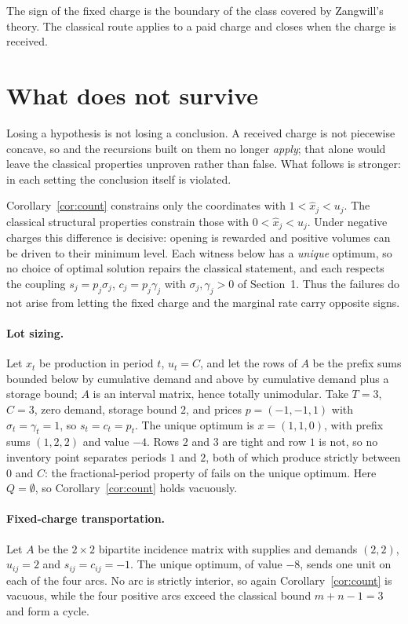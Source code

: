 \documentclass[review,11pt]{elsarticle}
\theoremstyle{remark}
\theoremstyle{definition}
\begin{document}
The sign of the fixed charge is the boundary of the class covered by Zangwill's theory.
The classical route applies to a paid charge and closes when the charge is received.

\section{What does not survive}\label{sec:fails}

Losing a hypothesis is not losing a conclusion. A received charge is not piecewise
concave, so \cite{fk71,love73} and the recursions built on them no longer \emph{apply};
that alone would leave the classical properties unproven rather than false. What follows
is stronger: in each setting the conclusion itself is violated.

Corollary~\ref{cor:count} constrains only the coordinates with $1<\hat x_j<u_j$. The
classical structural properties constrain those with $0<\hat x_j<u_j$. Under negative
charges this difference is decisive: opening is rewarded and positive volumes can be
driven to their minimum level. Each witness below has a
\emph{unique} optimum, so no choice of optimal solution repairs the classical statement,
and each respects the coupling $s_j=p_j\sigma_j$, $c_j=p_j\gamma_j$ with
$\sigma_j,\gamma_j>0$ of Section~1. Thus the failures do not arise from letting the
fixed charge and the marginal rate carry opposite signs.

\paragraph{Lot sizing.} Let $x_t$ be production in period $t$, $u_t=C$, and let the rows
of $A$ be the prefix sums bounded below by cumulative demand and above by cumulative
demand plus a storage bound; $A$ is an interval matrix, hence totally unimodular. Take
$T=3$, $C=3$, zero demand, storage bound $2$, and prices $p=(-1,-1,1)$ with
$\sigma_t=\gamma_t=1$, so $s_t=c_t=p_t$. The unique optimum is $x=(1,1,0)$, with prefix
sums $(1,2,2)$ and value $-4$. Rows $2$ and $3$ are tight and row $1$ is not, so no
inventory point separates periods $1$ and $2$, both of which produce strictly between $0$
and $C$: the fractional-period property of \cite{fk71,love73} fails on the unique
optimum. Here $Q=\emptyset$, so Corollary~\ref{cor:count} holds vacuously.

\paragraph{Fixed-charge transportation.} Let $A$ be the $2\times2$ bipartite incidence
matrix with supplies and demands $(2,2)$, $u_{ij}=2$ and $s_{ij}=c_{ij}=-1$. The unique
optimum, of value $-8$, sends one unit on each of the four arcs. No arc is strictly interior, so
again Corollary~\ref{cor:count} is vacuous, while the four positive arcs exceed the
classical bound $m+n-1=3$ and form a cycle.
\end{document}
